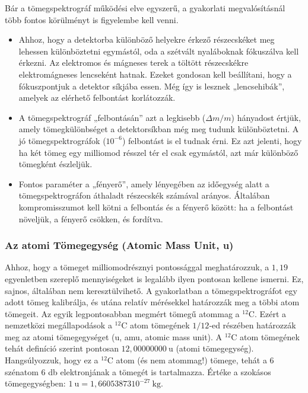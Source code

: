 \documentclass[../main.tex]{subfiles}
\begin{document}
Bár a tömegspektrográf működési elve egyszerű, a gyakorlati megvalósításnál több fontos körülményt is figyelembe kell venni.
\begin{itemize}
    \item Ahhoz, hogy a detektorba különböző helyekre érkező részecskéket meg lehessen különböztetni egymástól, oda a szétvált nyaláboknak fókuszálva kell érkezni. Az elektromos és mágneses terek a töltött részecskékre elektromágneses lencseként hatnak. Ezeket gondosan kell beállítani, hogy a fókuszpontjuk a detektor síkjába essen. Még így is lesznek „lencsehibák”, amelyek az elérhető felbontást korlátozzák.
    \item A tömegspektrográf „felbontásán” azt a legkisebb ($\Delta m/m$) hányadost értjük, amely tömegkülönbséget a detektorsíkban még meg tudunk különböztetni. A jó tömegspektrográfok ($10^{-6}$) felbontást is el tudnak érni. Ez azt jelenti, hogy ha két tömeg egy milliomod résszel tér el csak egymástól, azt már különböző tömegként észleljük.
    \item Fontos paraméter a „fényerő”, amely lényegében az időegység alatt a tömegspektrográfon áthaladt részecskék számával arányos. Általában kompromisszumot kell kötni a felbontás és a fényerő között: ha a felbontást növeljük, a fényerő csökken, és fordítva.
\end{itemize}

\subsubsection*{Az atomi Tömegegység (Atomic Mass Unit, u)}
Ahhoz, hogy a tömeget milliomodrésznyi pontossággal meghatározzuk, a $1{,}19$ egyenletben szereplő mennyiségeket is legalább ilyen pontosan kellene ismerni. Ez, sajnos, általában nem keresztülvihető. A gyakorlatban a tömegspektrográfot egy adott tömeg kalibrálja, és utána relatív mérésekkel határozzák meg a többi atom tömegeit. Az egyik legpontosabban megmért tömegű atommag a $^{12}\mathrm{C}$. Ezért a nemzetközi megállapodások a $^{12}\mathrm{C}$ atom tömegének $1/12$‑ed részében határozzák meg az atomi tömegegységet (u, amu, atomic mass unit). A $^{12}\mathrm{C}$ atom tömegének tehát definíció szerint pontosan $12{,}00000000\ \mathrm{u}$ (atomi tömegegység). Hangsúlyozzuk, hogy ez a $^{12}\mathrm{C}$ atom (és nem atommag!) tömege, tehát a $6$ szénatom $6$ db elektronjának a tömegét is tartalmazza.  
Értéke a szokásos tömegegységben: $1\ \mathrm{u}=1{,}6605387310^{-27}\ \mathrm{kg}$.  
\end{document}
